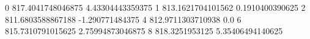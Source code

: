 0 817.4041748046875 4.43304443359375
1 813.1621704101562 0.1910400390625
2 811.6803588867188 -1.290771484375
4 812.9711303710938 0.0
6 815.7310791015625 2.75994873046875
8 818.3251953125 5.35406494140625
